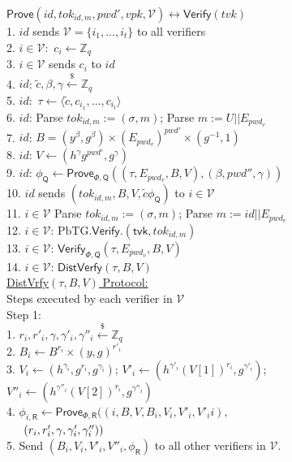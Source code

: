 \documentclass[conference]{IEEEtran}
\newcommand{\cQ}{\mathsf{Q}}
\newcommand{\cR}{\mathsf{R}}
\newcommand{\cV}{\mathcal{V}}
\newcommand{\pwd}{pwd}
\newcommand{\uid}{id}
\newcommand{\tvk}{tvk}
\newcommand{\vpk}{vpk}
\def\mg{\color{magenta}}
\begin{document}
\begin{figure}
\begin{multicols}{2}
\noindent\underline{$\mathsf{Prove}(\uid, tok_{\uid,m}, \pwd', \vpk, \cV) \longleftrightarrow \mathsf{Verify}(\tvk)$}\\
1. $\uid$ sends $\cV = \{i_{1},...,i_{t}\}$ to all verifiers\\  
2. $i \in \cV:$ $c_i \leftarrow \mathbb{Z}_q$\\
3. $i \in \cV$ sends $c_i$ to $\uid$\\
4. $\uid$: $\tilde{c}, \beta, \gamma \xleftarrow{\$} \mathbb{Z}_q$\\
5. $\uid:$ $\tau \leftarrow \langle \tilde{c}, c_{i_{1}},\ldots,c_{i_{t}} \rangle$\\
6. $\uid$: Parse $tok_{\uid,m} := (\sigma, m)$; Parse $m := U||E_{\pwd_{v}}$\\
7. $\uid$: $B = (y^{\beta},g^{\beta}) \times (E_{\pwd_{v}})^{\pwd'} \times (g^{-1}, 1)$\\
8. $\uid$: $V \leftarrow (h^{\gamma}g^{\pwd'},g^{\gamma})$\\ 
9. $\uid$: $\phi_{\cQ} \leftarrow \mathsf{Prove}_{\Phi,\cQ}((\tau, E_{\pwd_{v}},B,V), (\beta,\pwd'',\gamma))$\\ %
10. $\uid$ sends $(tok_{\uid,m},B , V, \tilde{c} \phi_{\cQ})$ to $i \in \cV$\\ 
11. $i \in \cV$ Parse $tok_{\uid,m} := (\sigma, m)$; Parse $m := \uid||E_{\pwd_{v}}$\\
12. $i \in \cV$: $\text{PbTG}.\mathsf{Verify}.(\mathsf{tvk},tok_{\uid,m})$\\
13. $i \in \cV$: $\mathsf{Verify}_{\Phi,\cQ}(\tau,E_{\pwd_{v}},B,V)$\\
14. $i \in \cV$: $\mathsf{DistVerfy}(\tau, B, V)$\\

\noindent \underline{DistVrfy$(\tau, B, V)$ Protocol:}\\ 
Steps executed by each verifier in $\cV$\\   
\noindent Step 1:\\
        1. $r_i, r'_i,\gamma, \gamma'_i, \gamma''_i \xleftarrow{\$} \mathbb{Z}_q$\\
        2. $B_i \leftarrow B^{r_i} \times (y,g)^{r'_i}$\\ 
        3. $V_i \leftarrow (h^{\gamma_i},g^{r_i},g^{\gamma_i})$; 
        $V'_i \leftarrow (h^{\gamma'_i}(V[1])^{r_i},g^{\gamma'_i})$; 
        $V''_i \leftarrow (h^{\gamma''_i}(V[2])^{r_i},g^{\gamma''_i})$\\
        4. $\phi_{i,\cR} \leftarrow \mathsf{Prove}_{\Phi,\cR}((i,B,V,B_i,V_i,V'_i, V'_ii),$\\
        $\indent (r_i,r'_i,\gamma, \gamma'_i, \gamma''_i))$\\
        5. Send $(B_i,V_i,V'_i,V''_i, \phi_{\cR})$ to all other verifiers in $\mathcal{V}$.\\
        

\end{multicols}
\end{figure}
\end{document}
